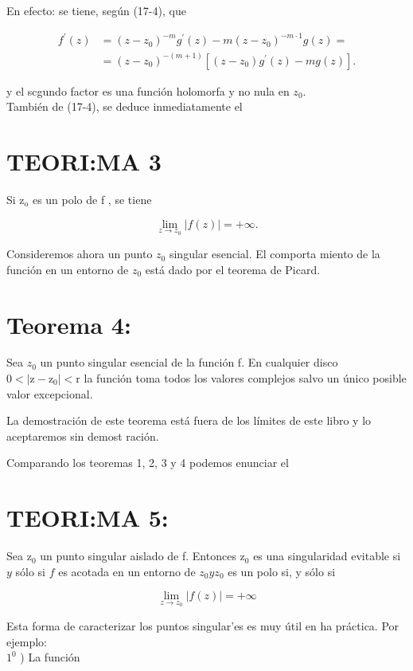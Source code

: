 \documentclass[10pt]{article}
\theoremstyle{plain}
\theoremstyle{definition}
\theoremstyle{remark}
\begin{document}
En efecto: se tiene, según (17-4), que

$$
\begin{aligned}
f^{\prime}(z) & =\left(z-z_{0}\right)^{-m} g^{\prime}(z)-m\left(z-z_{0}\right)^{-m \cdot 1} g(z)= \\
& =\left(z-z_{0}\right)^{-(m+1)}\left[\left(z-z_{0}\right) g^{\prime}(z)-m g(z)\right] .
\end{aligned}
$$

y el scgundo factor es una función holomorfa y no nula en $z_{0}$.\\
También de (17-4), se deduce inmediatamente el

\section*{TEORI:MA 3}
Si $\mathrm{z}_{\mathrm{o}}$ es un polo de f , se tiene


\begin{equation*}
\lim _{z \rightarrow z_{0}}|f(z)|=+\infty . \tag{17-5}
\end{equation*}


Consideremos ahora un punto $z_{0}$ singular esencial. El comporta miento de la función en un entorno de $z_{0}$ está dado por el teorema de Picard.

\section*{Teorema 4:}
Sea $z_{0}$ un punto singular esencial de la función f. En cualquier disco $0<\left|\mathrm{z}-\mathrm{z}_{0}\right|<\mathrm{r}$ la función toma todos los valores complejos salvo un único posible valor excepcional.

La demostración de este teorema está fuera de los límites de este libro y lo aceptaremos sin demost ración.

Comparando los teoremas 1, 2, 3 y 4 podemos enunciar el

\section*{TEORI:MA 5:}
Sea $\mathrm{z}_{0}$ un punto singular aislado de f. Entonces $\mathrm{z}_{0}$ es una singularidad evitable si $y$ sólo si $f$ es acotada en un entorno de $z_{0} y z_{0}$ es un polo si, y sólo si

$$
\lim _{z \rightarrow z_{0}}|f(z)|=+\infty
$$

Esta forma de caracterizar los puntos singular'es es muy útil en ha práctica. Por ejemplo:\\
$1^{0}$ ) La función
\end{document}
